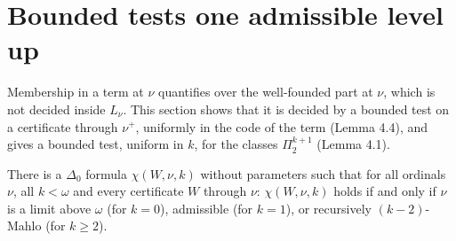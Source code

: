 \documentclass[11pt]{article}
\begin{document}
\section{Bounded tests one admissible level up}

Membership in a term at $\nu$ quantifies over the well-founded part at $\nu$, which is not decided inside $L_\nu$. This
section shows that it is decided by a bounded test on a certificate through $\nu^+$, uniformly in the code of the term
(Lemma 4.4), and gives a bounded test, uniform in $k$, for the classes $\Pi_2^{k+1}$ (Lemma 4.1).

\begin{statement} There is a $\Delta_0$ formula $\chi(W, \nu, k)$ without parameters such that for all
ordinals $\nu$, all $k < \omega$ and every certificate $W$ through $\nu$: $\chi(W,\nu,k)$ holds if and only if $\nu$
is a limit above $\omega$ (for $k = 0$), admissible (for $k = 1$), or recursively $(k-2)$-Mahlo (for $k \ge 2$).
\end{statement}
\end{document}
